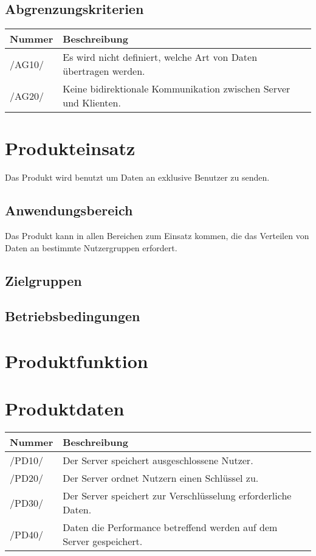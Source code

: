 \documentclass[a4paper,10pt]{article}
\newcommand\addrow[2]{#1 &#2\\ }
\newcommand\addheading[2]{#1 &#2\\ \hline}
\newcommand\tabularhead{\begin{tabular}{lp{13cm}}
\hline
}
\newenvironment{usecase}{\tabularhead}
{\hline\end{tabular}}
\begin{document}
\subsection{Abgrenzungskriterien}
\newcommand{\abgrenzungKuerzel}{AG}
\begin{usecase}
\addheading{Nummer}{Beschreibung}
\addrow{/\abgrenzungKuerzel10/} {Es wird nicht definiert, welche Art von Daten übertragen werden.}
\addrow{/\abgrenzungKuerzel20/} {Keine bidirektionale Kommunikation zwischen Server und Klienten.}
\end{usecase}

\section{Produkteinsatz}
Das Produkt wird benutzt um Daten an exklusive Benutzer zu senden.
\subsection{Anwendungsbereich}
Das Produkt kann in allen Bereichen zum Einsatz kommen, die das Verteilen von Daten an bestimmte Nutzergruppen erfordert.
\subsection{Zielgruppen}

\subsection{Betriebsbedingungen}

\section{Produktfunktion}

\section{Produktdaten}
\newcommand{\datenKuerzel}{PD}
\begin{usecase}
\addheading{Nummer}{Beschreibung}
\addrow{/\datenKuerzel10/} {Der Server speichert ausgeschlossene Nutzer.}
\addrow{/\datenKuerzel20/} {Der Server ordnet Nutzern einen Schlüssel zu.}
\addrow{/\datenKuerzel30/} {Der Server speichert zur Verschlüsselung erforderliche Daten.}
\addrow{/\datenKuerzel40/} {Daten die Performance betreffend werden auf dem Server gespeichert.}
\end{usecase}
\end{document}
